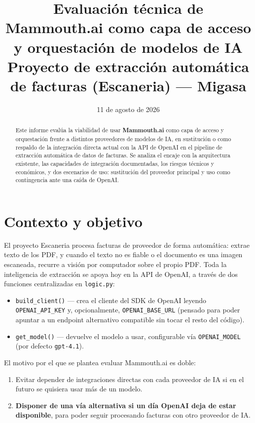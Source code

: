 \documentclass[11pt,a4paper]{article}
\title{\textbf{Evaluación técnica de Mammouth.ai como capa de acceso\\y orquestación de modelos de IA} \\[0.3em]
\large Proyecto de extracción automática de facturas (Escaneria) --- Migasa}
\author{}
\date{11 de agosto de 2026}
\begin{document}
\maketitle
\thispagestyle{empty}

\begin{abstract}
\noindent
Este informe evalúa la viabilidad de usar \textbf{Mammouth.ai} como capa de acceso y
orquestación frente a distintos proveedores de modelos de IA, en sustitución o como
respaldo de la integración directa actual con la API de OpenAI en el pipeline de
extracción automática de datos de facturas. Se analiza el encaje con la arquitectura
existente, las capacidades de integración documentadas, los riesgos técnicos y
económicos, y dos escenarios de uso: sustitución del proveedor principal y uso como
contingencia ante una caída de OpenAI.
\end{abstract}

\tableofcontents

\section{Contexto y objetivo}

El proyecto Escaneria procesa facturas de proveedor de forma automática: extrae
texto de los PDF, y cuando el texto no es fiable o el documento es una imagen
escaneada, recurre a visión por computador sobre el propio PDF. Toda la
inteligencia de extracción se apoya hoy en la API de OpenAI, a través de dos
funciones centralizadas en \texttt{logic.py}:

\begin{itemize}
    \item \texttt{build\_client()} --- crea el cliente del SDK de OpenAI leyendo
    \texttt{OPENAI\_API\_KEY} y, opcionalmente, \texttt{OPENAI\_BASE\_URL} (pensado
    para poder apuntar a un endpoint alternativo compatible sin tocar el resto
    del código).
    \item \texttt{get\_model()} --- devuelve el modelo a usar, configurable vía
    \texttt{OPENAI\_MODEL} (por defecto \texttt{gpt-4.1}).
\end{itemize}

El motivo por el que se plantea evaluar Mammouth.ai es doble:

\begin{enumerate}
    \item Evitar depender de integraciones directas con cada proveedor de IA si en
    el futuro se quisiera usar más de un modelo.
    \item \textbf{Disponer de una vía alternativa si un día OpenAI deja de estar
    disponible}, para poder seguir procesando facturas con otro proveedor de IA.
\end{enumerate}
\end{document}
